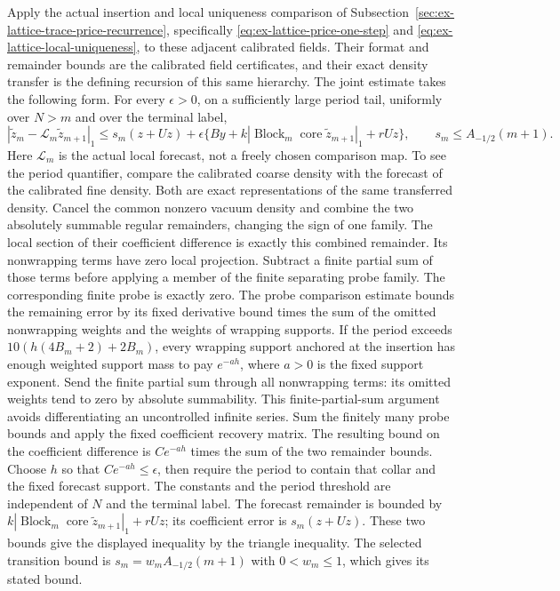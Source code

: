 Apply the actual insertion and local uniqueness comparison of
Subsection~\ref{sec:ex-lattice-trace-price-recurrence}, specifically
\eqref{eq:ex-lattice-price-one-step} and
\eqref{eq:ex-lattice-local-uniqueness}, to these adjacent calibrated
fields. Their format and remainder bounds are the calibrated field
certificates, and their exact density transfer is the defining recursion
of this same hierarchy. The joint estimate takes the following form. For every $\epsilon>0$, on a sufficiently
large period tail, uniformly over $N>m$ and over the terminal label,
\[
 |\widetilde z_m-\mathcal L_m\widetilde z_{m+1}|_1
 \le s_m(z+Uz)
   +\epsilon\{By+k|\operatorname{Block}_m
                 \operatorname{core}\widetilde z_{m+1}|_1+rUz\},
 \qquad s_m\le A_{-1/2}(m+1).
\]
Here $\mathcal L_m$ is the actual local forecast, not a freely chosen
comparison map. To see the period quantifier, compare the calibrated
coarse density with the forecast of the calibrated fine density.
Both are exact representations of the same transferred density. Cancel
the common nonzero vacuum density and combine the two absolutely
summable regular remainders, changing the sign of one family. The local
section of their coefficient difference is exactly this combined
remainder. Its nonwrapping terms have zero local projection. Subtract a finite
partial sum of those terms before applying a member of the finite
separating probe family. The corresponding finite probe is exactly
zero. The probe comparison estimate bounds the remaining error by
its fixed derivative bound times the sum of the omitted nonwrapping
weights and the weights of wrapping supports. If the period exceeds
$10(h(4B_m+2)+2B_m)$, every wrapping support anchored at the insertion
has enough weighted support mass to pay $e^{-a h}$, where $a>0$ is
the fixed support exponent. Send the finite partial sum through all
nonwrapping terms: its omitted weights tend to zero by absolute
summability. This finite-partial-sum argument avoids differentiating
an uncontrolled infinite series. Sum the finitely many probe bounds
and apply the fixed coefficient recovery matrix. The resulting bound
on the coefficient difference is
$C e^{-a h}$ times the sum of the two remainder bounds. Choose $h$ so that
$Ce^{-ah}\le\epsilon$, then require the period to contain that collar
and the fixed forecast support. The constants and the period threshold
are independent of $N$ and the terminal label. The forecast remainder
is bounded by $k|\operatorname{Block}_m\operatorname{core}
\widetilde z_{m+1}|_1+rUz$; its coefficient error is $s_m(z+Uz)$.
These two bounds give the displayed inequality by the triangle
inequality. The selected transition bound is
$s_m=w_m A_{-1/2}(m+1)$ with $0<w_m\le1$, which gives its stated bound.

